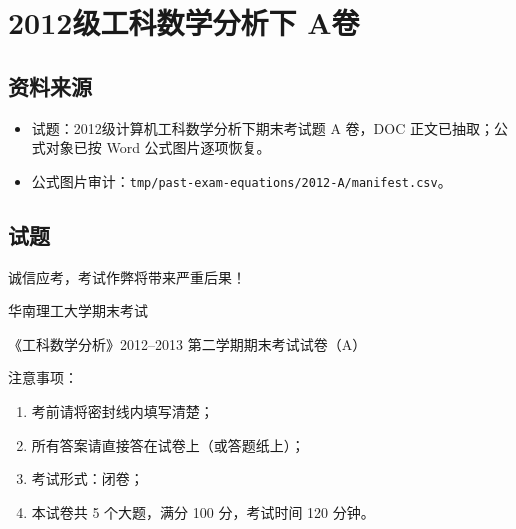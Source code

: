 \section{2012级工科数学分析下 A卷}

\subsection{资料来源}
\begin{itemize}
  \item 试题：2012级计算机工科数学分析下期末考试题 A 卷，DOC 正文已抽取；公式对象已按 Word 公式图片逐项恢复。
  \item 公式图片审计：\texttt{tmp/past-exam-equations/2012-A/manifest.csv}。
\end{itemize}

\subsection{试题}
诚信应考，考试作弊将带来严重后果！

华南理工大学期末考试

《工科数学分析》2012--2013 第二学期期末考试试卷（A）

注意事项：
\begin{enumerate}
  \item 考前请将密封线内填写清楚；
  \item 所有答案请直接答在试卷上（或答题纸上）；
  \item 考试形式：闭卷；
  \item 本试卷共 5 个大题，满分 100 分，考试时间 120 分钟。
\end{enumerate}

